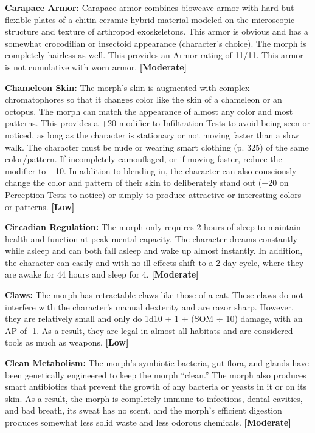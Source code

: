 \textbf{Carapace Armor:} Carapace armor combines bioweave armor with hard but flexible plates of a chitin-ceramic hybrid material modeled on the microscopic structure and texture of arthropod exoskeletons. This armor is obvious and has a somewhat crocodilian or insectoid appearance (character’s choice). The morph is completely hairless as well. This provides an Armor rating of 11/11. This armor is not cumulative with worn armor. \textbf{[Moderate]} 

\textbf{Chameleon Skin:} The morph’s skin is augmented with complex chromatophores so that it changes color like the skin of a chameleon or an octopus. The morph can match the appearance of almost any color and most patterns. This provides a +20 modifier to Infiltration Tests to avoid being seen or noticed, as long as the character is stationary or not moving faster than a slow walk. The character must be nude or wearing smart clothing (p. 325) of the same color/pattern. If incompletely camouflaged, or if moving faster, reduce the modifier to +10. In addition to blending in, the character can also consciously change the color and pattern of their skin to deliberately stand out (+20 on Perception Tests to notice) or simply to produce attractive or interesting colors or patterns. \textbf{[Low]} 

\textbf{Circadian Regulation:} The morph only requires 2 hours of sleep to maintain health and function at peak mental capacity. The character dreams constantly while asleep and can both fall asleep and wake up almost instantly. In addition, the character can easily and with no ill-effects shift to a 2-day cycle, where they are awake for 44 hours and sleep for 4. \textbf{[Moderate]} 

\textbf{Claws:} The morph has retractable claws like those of a cat. These claws do not interfere with the character’s manual dexterity and are razor sharp. However, they are relatively small and only do 1d10 + 1 + (SOM $\div$ 10) damage, with an AP of -1. As a result, they are legal in almost all habitats and are considered tools as much as weapons. \textbf{[Low]} 

\textbf{Clean Metabolism:} The morph’s symbiotic bacteria, gut flora, and glands have been genetically engineered to keep the morph ``clean.'' The morph also produces smart antibiotics that prevent the growth of any bacteria or yeasts in it or on its skin. As a result, the morph is completely immune to infections, dental cavities, and bad breath, its sweat has no scent, and the morph’s efficient digestion produces somewhat less solid waste and less odorous chemicals. \textbf{[Moderate]} 

